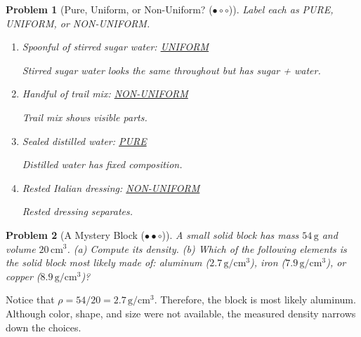 \documentclass[a4paper,11pt]{article}
\newcommand{\easy}{(\ensuremath{\bullet \circ \circ})}
\newcommand{\medium}{(\ensuremath{\bullet \bullet \circ})}
\theoremstyle{listprobstyle}
\newtheorem{problem}{Problem}
\newenvironment{solution}
    {\par\begingroup\color{BrickRed}}
    {\par\endgroup}
\begin{document}
\begin{problem}[Pure, Uniform, or Non-Uniform? \easy]
Label each as PURE, UNIFORM, or NON-UNIFORM.
\vspace{-0.6\baselineskip}
\begin{enumerate}[label=\alph*),itemsep=0pt,parsep=0pt,topsep=0pt]
\item Spoonful of stirred sugar water:
    \underline{\textcolor{BrickRed}{UNIFORM}}
\begin{solution}
Stirred sugar water looks the same throughout but has sugar + water.
\end{solution}
\vspace{0.5\baselineskip}

\item Handful of trail mix:
    \underline{\textcolor{BrickRed}{NON-UNIFORM}}
\begin{solution}
Trail mix shows visible parts.
\end{solution}
\vspace{0.5\baselineskip}

\item Sealed distilled water:
    \underline{\textcolor{BrickRed}{PURE}}
\begin{solution}
Distilled water has fixed composition.
\end{solution}
\vspace{0.5\baselineskip}

\item Rested Italian dressing:
    \underline{\textcolor{BrickRed}{NON-UNIFORM}}
\begin{solution}
Rested dressing separates.
\end{solution}
\end{enumerate}
\end{problem}

\begin{problem}[A Mystery Block \medium]
A small solid block has mass $54\,\mathrm{g}$ and volume
$20\,\mathrm{cm^3}$. (a) Compute its density. (b) Which of the
following elements is the solid block most likely made of:
aluminum ($2.7\,\mathrm{g/cm^3}$), iron ($7.9\,\mathrm{g/cm^3}$),
or copper ($8.9\,\mathrm{g/cm^3}$)?
\end{problem}
\vspace{-\baselineskip}
\begin{solution}
Notice that $\rho = 54/20 = 2.7\,\mathrm{g/cm^3}$. Therefore,
the block is most likely aluminum. Although color, shape, and size
were not available, the measured density narrows down the choices.
\end{solution}
\end{document}

